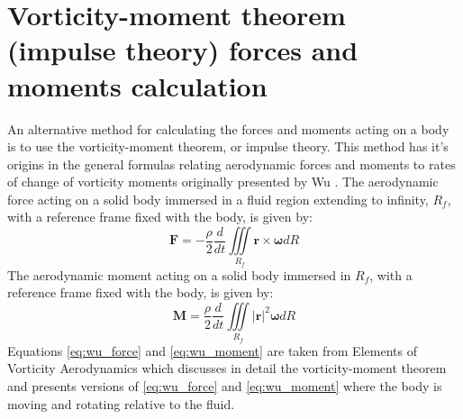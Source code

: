 \documentclass[a4paper,11pt]{report}
\begin{document}
\section{Vorticity-moment theorem (impulse theory) forces and moments calculation}
An alternative method for calculating the forces and moments acting on a body is to use the vorticity-moment theorem, or impulse theory. This method has it's origins in the general formulas relating aerodynamic forces and moments to rates of change of vorticity moments originally presented by Wu \cite{Wu1981}. The aerodynamic force acting on a solid body immersed in a fluid region extending to infinity, $R_{f}$, with a reference frame fixed with the body, is given by:
\begin{equation}
    \mathbf{F} = - \frac{\rho}{2}\frac{d}{dt} \iiint\limits_{R_{f}} \mathbf{r}\times\pmb{\omega} dR
    \label{eq:wu_force}
\end{equation}
The aerodynamic moment acting on a solid body immersed in $R_{f}$, with a reference frame fixed with the body, is given by:
\begin{equation}
    \mathbf{M} = \frac{\rho}{2}\frac{d}{dt} \iiint\limits_{R_{f}} \lvert\mathbf{r}\rvert^2\pmb{\omega} dR
    \label{eq:wu_moment}
\end{equation}
Equations \ref{eq:wu_force} and \ref{eq:wu_moment} are taken from Elements of Vorticity Aerodynamics \cite{Wu2018} which discusses in detail the vorticity-moment theorem and presents versions of \ref{eq:wu_force} and \ref{eq:wu_moment} where the body is moving and rotating relative to the fluid.


\end{document}
